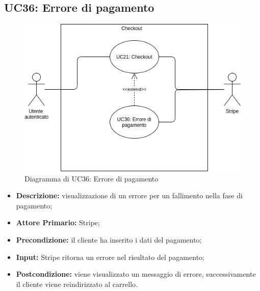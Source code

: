 \subsection{UC36: Errore di pagamento}
\label{sec:UC36}
\begin{figure}[!ht]
    \caption{Diagramma di UC36: Errore di pagamento}
    \vspace{10px}
    \includegraphics[scale=0.5]{../../../Images/AnalisiRequisiti/UC36}
    \centering
\end{figure}
\begin{itemize}
    \item \textbf{Descrizione:} visualizzazione di un errore per un fallimento nella fase di pagamento;
    \item \textbf{Attore Primario:} Stripe;
    \item \textbf{Precondizione:} il cliente ha inserito i dati del pagamento;
    \item \textbf{Input:} Stripe ritorna un errore nel risultato del pagamento;
    \item \textbf{Postcondizione:} viene visualizzato un messaggio di errore, successivamente il cliente viene reindirizzato al carrello.
\end{itemize}